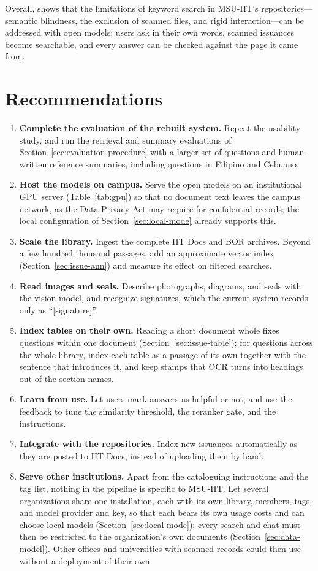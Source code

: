 Overall, \cs{} shows that the limitations of keyword search in MSU-IIT's repositories---semantic blindness, the exclusion of scanned files, and rigid interaction---can be addressed with open models: users ask in their own words, scanned issuances become searchable, and every answer can be checked against the page it came from.

\section{Recommendations}

\begin{enumerate}
  \item \textbf{Complete the evaluation of the rebuilt system.} Repeat the usability study, and run the retrieval and summary evaluations of Section~\ref{sec:evaluation-procedure} with a larger set of questions and human-written reference summaries, including questions in Filipino and Cebuano.
  \item \textbf{Host the models on campus.} Serve the open models on an institutional GPU server (Table~\ref{tab:gpu}) so that no document text leaves the campus network, as the Data Privacy Act may require for confidential records; the local configuration of Section~\ref{sec:local-mode} already supports this.
  \item \textbf{Scale the library.} Ingest the complete IIT Docs and BOR archives. Beyond a few hundred thousand passages, add an approximate vector index (Section~\ref{sec:issue-ann}) and measure its effect on filtered searches.
  \item \textbf{Read images and seals.} Describe photographs, diagrams, and seals with the vision model, and recognize signatures, which the current system records only as ``[signature]''.
  \item \textbf{Index tables on their own.} Reading a short document whole fixes questions within one document (Section~\ref{sec:issue-table}); for questions across the whole library, index each table as a passage of its own together with the sentence that introduces it, and keep stamps that OCR turns into headings out of the section names.
  \item \textbf{Learn from use.} Let users mark answers as helpful or not, and use the feedback to tune the similarity threshold, the reranker gate, and the instructions.
  \item \textbf{Integrate with the repositories.} Index new issuances automatically as they are posted to IIT Docs, instead of uploading them by hand.
  \item \textbf{Serve other institutions.} Apart from the cataloguing instructions and the tag list, nothing in the pipeline is specific to MSU-IIT. Let several organizations share one installation, each with its own library, members, tags, and model provider and key, so that each bears its own usage costs and can choose local models (Section~\ref{sec:local-mode}); every search and chat must then be restricted to the organization's own documents (Section~\ref{sec:data-model}). Other offices and universities with scanned records could then use \cs{} without a deployment of their own.
\end{enumerate}
